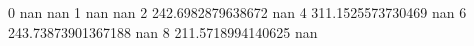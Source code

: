 0 nan nan
1 nan nan
2 242.6982879638672 nan
4 311.1525573730469 nan
6 243.73873901367188 nan
8 211.5718994140625 nan
